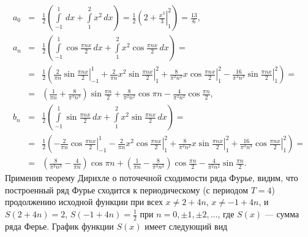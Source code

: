 $$
\begin{array}{rcl}
	a_0 &=& \displaystyle\frac{1}{2}\left.\left(
	\int\limits_{-1}^1
	\,dx + \int\limits_1^2
	x^2\,dx \right) = 
	\frac{1}{2}\left(
	2 +  \frac{x^3}{3}
	\right|_1^2 \right) = \frac{13}{6},												\\[12pt]
	a_n &=& \displaystyle\frac{1}{2}\left(
	\int\limits_{-1}^1
	\cos \frac{\pi nx}{2}\,dx + \int\limits_1^2
	x^2\cos \frac{\pi nx}{2}\,dx \right) ={}									\\[12pt]
	&=& \displaystyle\frac{1}{2}\left(
	\left.\frac{2}{\pi n}\sin\frac{\pi nx}{2} \right|_{-1}^1
	+\left.\frac{2}{\pi n}x^2\sin\frac{\pi nx}{2} \right|_1^2 
	+\left.\frac{8}{\pi^2 n^2}x\cos\frac{\pi nx}{2} \right|_1^2
	-\left.\frac{16}{\pi^3 n^3}\sin\frac{\pi nx}{2} \right|_1^2\right) = 	\\[12pt]
	&=& \displaystyle\left(\frac{1}{\pi n} + \frac{8}{\pi^3 n^3}\right)\sin\frac{\pi n}{2}
	+\frac{8}{\pi^2 n^2}\cos\pi n - \frac{4}{\pi^2 n^2}\cos\frac{\pi n}{2},	\\[12pt]
	b_n &=& \displaystyle\frac{1}{2}\left(
	\int\limits_{-1}^1
	\sin \frac{\pi nx}{2}\,dx + \int\limits_1^2
	x^2\sin \frac{\pi nx}{2}\,dx \right) ={}									\\[12pt]
	&=& \displaystyle\frac{1}{2}\left(
	\left.-\frac{2}{\pi n}\cos\frac{\pi nx}{2} \right|_{-1}^1
	-\left.\frac{2}{\pi n}x^2\cos\frac{\pi nx}{2} \right|_1^2 
	+\left.\frac{8}{\pi^2 n^2}x\sin\frac{\pi nx}{2} \right|_1^2
	+\left.\frac{16}{\pi^3 n^3}\cos\frac{\pi nx}{2} \right|_1^2\right) =	\\[12pt]
	&=& \displaystyle\left(\frac{8}{\pi^3 n^3}-\frac{4}{\pi n}\right)\cos\pi n + (\frac{1}{\pi n} - \frac{8}{\pi^3 n^3})\cos\frac{\pi n}{2} - \frac{4}{\pi^2n^2}\sin\frac{\pi n}{2}.
\end{array}
$$
Применив теорему Дирихле о поточечной сходимости ряда Фурье, видим, что построенный ряд Фурье сходится 
к периодическому (с периодом $T=4$) продолжению исходной функции при всех $x\ne 2+4n$, $x\ne -1+4n$, и 
$S(2+4n)=2$, $S(-1+4n)=\frac{1}{2}$ при $n=0,\pm1,\pm2,\ldots$, где $S(x)$ --- сумма ряда Ферье. 
График функции $S(x)$ имеет следующий вид
